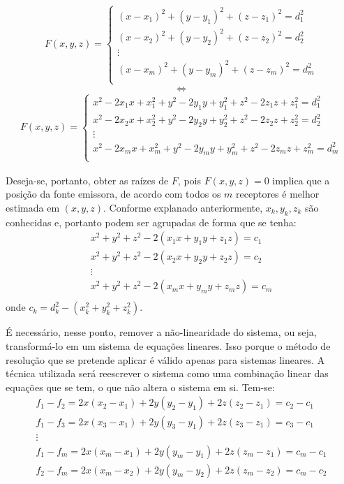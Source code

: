 	\begin{align*}
		F(x,y,z) =
		\left \{
		\begin{array}{cl}
			(x - x_1)^2 + (y - y_1)^2 + (z - z_1)^2 = d_1^2\\
			(x - x_2)^2 + (y - y_2)^2 + (z - z_2)^2 = d_2^2\\
			\vdots \\
			(x - x_m)^2 + (y - y_m)^2 + (z - z_m)^2 = d_m^2\\
		\end{array}
		\right.
	\end{align*}
	$$\iff$$
	\begin{align*}
		F(x,y,z) =
		\left \{
		\begin{array}{cl}
			x^2 - 2x_1x + x_1^2 + y^2 - 2y_1y + y_1^2 + z^2 - 2z_1z + z_1^2 = d_1^2\\
			x^2 - 2x_2x + x_2^2 + y^2 - 2y_2y + y_2^2 + z^2 - 2z_2z + z_2^2 = d_2^2\\
			\vdots \\
			x^2 - 2x_mx + x_m^2 + y^2 - 2y_my + y_m^2 + z^2 - 2z_mz + z_m^2 = d_m^2\\
		\end{array}
		\right.
	\end{align*}

	Deseja-se, portanto, obter as raízes de $F$, pois $F(x,y,z) = 0$ implica que a posição
	da fonte emissora, de acordo com todos os $m$ receptores é melhor estimada em $(x,y,z)$.
	Conforme explanado anteriormente, $x_k, y_k, z_k$ são conhecidas e, portanto podem ser
	agrupadas de forma que se tenha:
	\[
	\begin{array}{cl}
		x^2 + y^2 + z^2 - 2(x_1x + y_1y + z_1z) = c_1\\
		x^2 + y^2 + z^2 - 2(x_2x + y_2y + z_2z) = c_2\\
		\vdots \\
		x^2 + y^2 + z^2 - 2(x_mx + y_my + z_mz) = c_m\\
	\end{array}
	\]
	onde $c_k = d_k^2 - (x_k^2 + y_k^2 + z_k^2)$.

	É necessário, nesse ponto, remover a não-linearidade do sistema, ou seja, transformá-lo
	em um sistema de equações lineares. Isso porque o método de resolução que se pretende
	aplicar é válido apenas para sistemas lineares. A técnica utilizada será reescrever o sistema
	como uma combinação linear das equações que se tem, o que não altera o sistema em si. Tem-se:
	\[
	\begin{array}{cl}
		f_1-f_2 = 2x(x_2-x_1) + 2y(y_2-y_1) + 2z(z_2-z_1) = c_2-c_1\\
		f_1-f_3 = 2x(x_3-x_1) + 2y(y_3-y_1) + 2z(z_3-z_1) = c_3-c_1\\
		\vdots \\
		f_1-f_m = 2x(x_m-x_1) + 2y(y_m-y_1) + 2z(z_m-z_1) = c_m-c_1\\
		f_2-f_m = 2x(x_m-x_2) + 2y(y_m-y_2) + 2z(z_m-z_2) = c_m-c_2\\
	\end{array}
	\]

